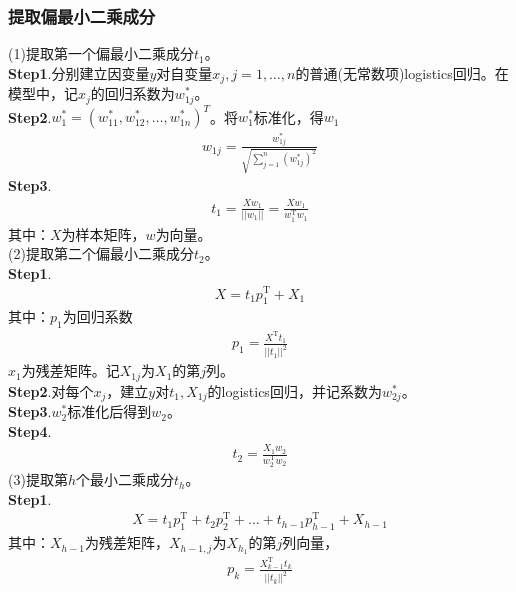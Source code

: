         \subsubsection{提取偏最小二乘成分}
            (1)提取第一个偏最小二乘成分$t_1$。\\
            \textbf{Step1}.分别建立因变量$y$对自变量$x_j,j =1,\dots,n$的普通(无常数项)logistics回归。在模型中，记$x_j$的回归系数为$w_{1j}^*$。\\
            \textbf{Step2}.$w_1^* = (w_{11}^*,w_{12}^*,\dots,w_{1n}^*)^T$。将$w_1^*$标准化，得$w_1$
            \begin{align*}
            w_{1j} = \frac{w_{1j}^*}{\sqrt{\sum\limits_{j=1}^n (w_{1j}^*)^2}}
            \end{align*}
            \textbf{Step3}.
            \begin{align*}
            t_1 = \frac{Xw_1}{||w_1||} = \frac{Xw_1}{w_1^\mathrm{T}w_1}
            \end{align*}
            其中：$X$为样本矩阵，$w$为向量。\\
            (2)提取第二个偏最小二乘成分$t_2$。\\
            \textbf{Step1}.
            \begin{align*}
            X = t_1p_1^\mathrm{T}+X_1
            \end{align*}
            其中：$p_1$为回归系数
            \begin{align*}
            p_1 = \frac{X^\mathrm{T}t_1}{||t_1||^2}
            \end{align*}
            $x_1$为残差矩阵。记$X_{1j}$为$X_1$的第$j$列。\\
            \textbf{Step2}.对每个$x_j$，建立$y$对$t_1,X_{1j}$的logistics回归，并记系数为$w_{2j}^*$。\\
            \textbf{Step3}.$w_2^*$标准化后得到$w_2$。\\
            \textbf{Step4}.
            \begin{align*}
            t_2 = \frac{X_1w_2}{w_2^\mathrm{T}w_2}
            \end{align*}
            (3)提取第$h$个最小二乘成分$t_h$。\\
            \textbf{Step1}.
            \begin{align*}
            X= t_1p_1^\mathrm{T}+t_2p_2^\mathrm{T}+\dots+t_{h-1}p_{h-1}^\mathrm{T}+X_{h-1}
            \end{align*}
            其中：$X_{h-1}$为残差矩阵，$X_{h-1,j}$为$X_{h_1}$的第$j$列向量，
            \begin{align*}
            p_k = \frac{X_{k-1}^\mathrm{T}t_k}{||t_k||^2}
            \end{align*}
